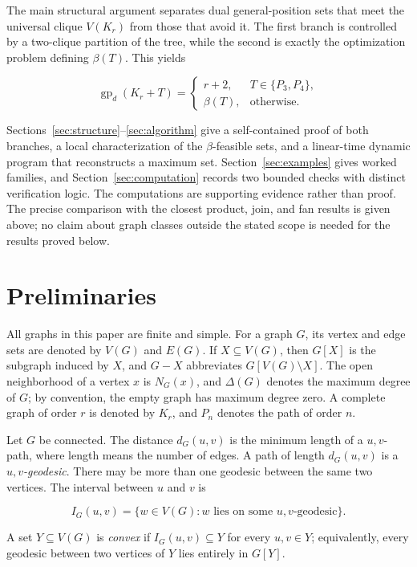 \documentclass[11pt,a4paper]{article}
\numberwithin{equation}{section}
\begin{document}
The main structural argument separates dual general-position sets that
meet the universal clique \(V(K_r)\) from those that avoid it. The first
branch is controlled by a two-clique partition of the tree, while the
second is exactly the optimization problem defining \(\beta(T)\). This
yields

\[
\operatorname{gp}_d(K_r+T)=
\begin{cases}
r+2, & T\in\{P_3,P_4\},\\
\beta(T), & \text{otherwise}.
\end{cases}
\]

Sections~\ref{sec:structure}--\ref{sec:algorithm} give a self-contained proof of both branches, a local
characterization of the \(\beta\)-feasible sets, and a linear-time
dynamic program that reconstructs a maximum set. Section~\ref{sec:examples} gives worked
families, and Section~\ref{sec:computation} records two bounded checks with
distinct verification logic. The computations are supporting evidence rather
than proof. The precise comparison with the closest product, join, and fan
results is given above; no claim about graph classes outside the stated scope
is needed for the results proved below.

\section{Preliminaries}\label{sec:preliminaries}

All graphs in this paper are finite and simple. For a graph \(G\), its
vertex and edge sets are denoted by \(V(G)\) and \(E(G)\). If
\(X\subseteq V(G)\), then \(G[X]\) is the subgraph induced by \(X\), and
\(G-X\) abbreviates \(G[V(G)\setminus X]\). The open neighborhood of a
vertex \(x\) is \(N_G(x)\), and \(\Delta(G)\) denotes the maximum degree
of \(G\); by convention, the empty graph has maximum degree zero. A
complete graph of order \(r\) is denoted by \(K_r\), and
\(P_n\) denotes the path of order \(n\).

Let \(G\) be connected. The distance \(d_G(u,v)\) is the minimum length
of a \(u,v\)-path, where length means the number of edges. A path of
length \(d_G(u,v)\) is a \emph{\(u,v\)-geodesic}. There may be more than
one geodesic between the same two vertices. The interval between \(u\)
and \(v\) is

\[
I_G(u,v)=\{w\in V(G):w\text{ lies on some }u,v\text{-geodesic}\}.
\]

A set \(Y\subseteq V(G)\) is \emph{convex} if \(I_G(u,v)\subseteq Y\)
for every \(u,v\in Y\); equivalently, every geodesic between two
vertices of \(Y\) lies entirely in \(G[Y]\).
\end{document}
